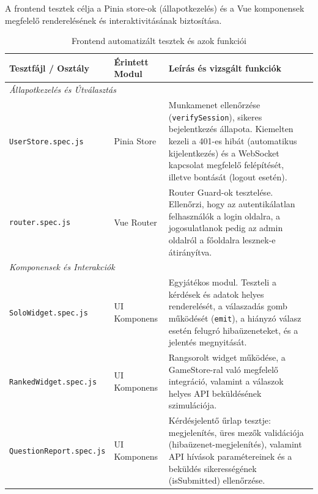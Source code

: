 A frontend tesztek célja a Pinia store-ok (állapotkezelés) és a Vue komponensek megfelelő renderelésének és interaktivitásának biztosítása.

\begin{table}[h!]
    \centering
    \small
    \begin{tabularx}{\textwidth}{|l|X|X|}
        \hline
        \rowcolor[HTML]{EFEFEF} 
        \textbf{Tesztfájl / Osztály} & \textbf{Érintett Modul} & \textbf{Leírás és vizsgált funkciók} \\ \hline
        
        \multicolumn{3}{|l|}{\cellcolor[HTML]{F5F5F5}\textit{Állapotkezelés és Útválasztás}} \\ \hline
        \texttt{UserStore.spec.js} & Pinia Store & Munkamenet ellenőrzése (\texttt{verifySession}), sikeres bejelentkezés állapota. Kiemelten kezeli a 401-es hibát (automatikus kijelentkezés) és a WebSocket kapcsolat megfelelő felépítését, illetve bontását (logout esetén). \\ \hline
        \texttt{router.spec.js} & Vue Router & Router Guard-ok tesztelése. Ellenőrzi, hogy az autentikálatlan felhasználók a login oldalra, a jogosulatlanok pedig az admin oldalról a főoldalra lesznek-e átirányítva. \\ \hline
        
        \multicolumn{3}{|l|}{\cellcolor[HTML]{F5F5F5}\textit{Komponensek és Interakciók}} \\ \hline
        \texttt{SoloWidget.spec.js} & UI Komponens & Egyjátékos modul. Teszteli a kérdések és adatok helyes renderelését, a válaszadás gomb működését (\texttt{emit}), a hiányzó válasz esetén felugró hibaüzeneteket, és a jelentés megnyitását. \\ \hline
        \texttt{RankedWidget.spec.js} & UI Komponens & Rangsorolt widget működése, a GameStore-ral való megfelelő integráció, valamint a válaszok helyes API beküldésének szimulációja. \\ \hline
        \texttt{QuestionReport.spec.js} & UI Komponens & Kérdésjelentő űrlap tesztje: megjelenítés, üres mezők validációja (hibaüzenet-megjelenítés), valamint API hívások paramétereinek és a beküldés sikerességének (isSubmitted) ellenőrzése. \\ \hline
    \end{tabularx}
    \caption{Frontend automatizált tesztek és azok funkciói}
\end{table}